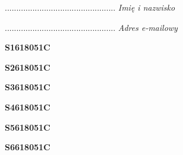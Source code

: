 \begin{turn}{90}\begin{minipage}{\linewidth} \vspace{20mm} ................................................  \textit{Imię i nazwisko}\end{minipage}\end{turn}

\begin{turn}{90}\begin{minipage}{\linewidth} \vspace{20mm} ................................................  \textit{Adres e-mailowy}\end{minipage}\end{turn}

\begin{turn}{90}\huge \begin{minipage}{\linewidth} \vspace{10mm}\textbf{S1618051C}\end{minipage}\end{turn}

\begin{turn}{90}\huge \begin{minipage}{\linewidth} \vspace{10mm}\textbf{S2618051C}\end{minipage}\end{turn}

\begin{turn}{90}\huge \begin{minipage}{\linewidth} \vspace{10mm}\textbf{S3618051C}\end{minipage}\end{turn}

\begin{turn}{90}\huge \begin{minipage}{\linewidth} \vspace{10mm}\textbf{S4618051C}\end{minipage}\end{turn}

\begin{turn}{90}\huge \begin{minipage}{\linewidth} \vspace{10mm}\textbf{S5618051C}\end{minipage}\end{turn}

\begin{turn}{90}\huge \begin{minipage}{\linewidth} \vspace{10mm}\textbf{S6618051C}\end{minipage}\end{turn}

